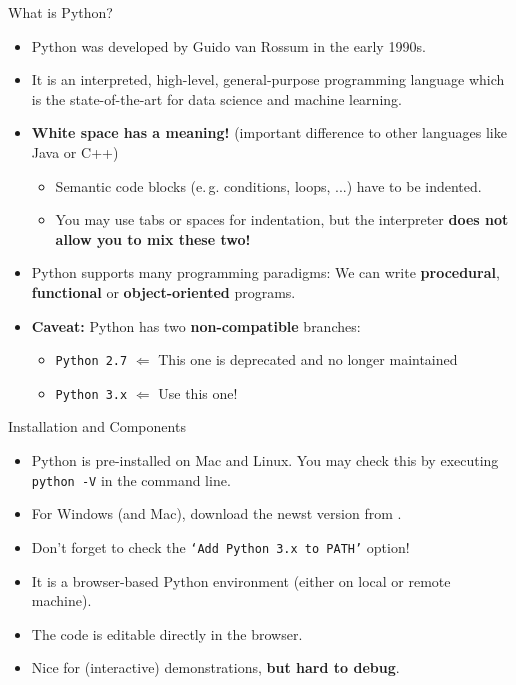 \begin{dwHeaderFrame}{What is Python?}
	\begin{itemize}
		\item Python was developed by Guido van Rossum in the early 1990s.
		\item It is an interpreted, high-level, general-purpose programming language which is the state-of-the-art for data science and machine learning.
		\item \textbf{White space has a meaning!} (important difference to other languages like Java or C++)
		\begin{itemize}
			\item Semantic code blocks (e.\,g. conditions, loops, ...) have to be indented.
			\item You may use tabs or spaces for indentation, but the interpreter \textbf{does not allow you to mix these two!}
		\end{itemize}
		\item Python supports many programming paradigms: We can write \textbf{procedural}, \textbf{functional} or \textbf{object-oriented} programs.
	\end{itemize}
\end{dwHeaderFrame}


\begin{frame}
	\begin{itemize}
		\item \textbf{Caveat:} Python has two \textbf{non-compatible} branches:
		\begin{itemize}
			\item \texttt{Python 2.7} $\Longleftarrow$ This one is deprecated and no longer maintained
			\item \texttt{Python 3.x} $\Longleftarrow$ Use this one!
		\end{itemize}
	\end{itemize}
\end{frame}


\begin{dwHeaderFrame}{Installation and Components}
	\begin{itemize}
		\item Python is pre-installed on Mac and Linux. You may check this by executing \texttt{python -V} in the command line.
		\item For Windows (and Mac), download the newst version from .
		\item Don't forget to check the \texttt{`Add Python 3.x to PATH'} option!
	\end{itemize}
	\begin{itemize}
		\item It is a browser-based Python environment (either on local or remote machine).
		\item The code is editable directly in the browser.
		\item Nice for (interactive) demonstrations, \textbf{but hard to debug}.
	\end{itemize}
\end{dwHeaderFrame}


